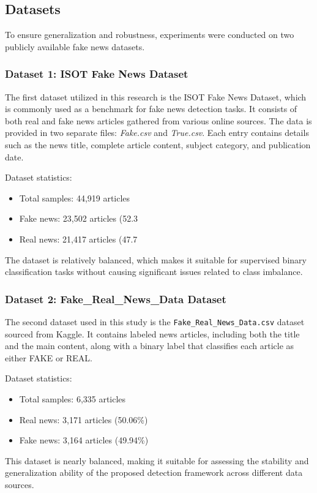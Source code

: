 \documentclass[conference]{IEEEtran}
\begin{document}
\subsection{Datasets}
To ensure generalization and robustness, experiments were conducted on two publicly available fake news datasets.

\subsubsection{Dataset 1: ISOT Fake News Dataset}
The first dataset utilized in this research is the ISOT Fake News Dataset, which is commonly used as a benchmark for fake news detection tasks. It consists of both real and fake news articles gathered from various online sources. The data is provided in two separate files: \textit{Fake.csv} and \textit{True.csv}. Each entry contains details such as the news title, complete article content, subject category, and publication date.

Dataset statistics:
\begin{itemize}
\item Total samples: 44,919 articles
\item Fake news: 23,502 articles (52.3%
\item Real news: 21,417 articles (47.7%
\end{itemize}

The dataset is relatively balanced, which makes it suitable for supervised binary classification tasks without causing significant issues related to class imbalance.

\subsubsection{Dataset 2: Fake\_Real\_News\_Data Dataset}
The second dataset used in this study is the \texttt{Fake\_Real\_News\_Data.csv} dataset sourced from Kaggle. It contains labeled news articles, including both the title and the main content, along with a binary label that classifies each article as either FAKE or REAL.

Dataset statistics:
\begin{itemize}
    \item Total samples: 6,335 articles
    \item Real news: 3,171 articles (50.06\%)
    \item Fake news: 3,164 articles (49.94\%)
\end{itemize}
This dataset is nearly balanced, making it suitable for assessing the stability and generalization ability of the proposed detection framework across different data sources.
\end{document}

